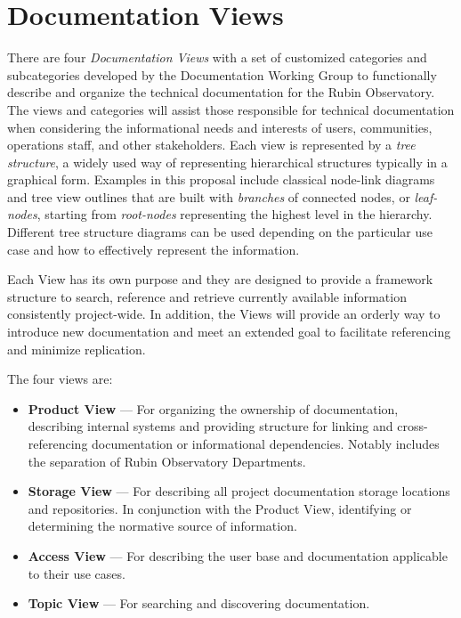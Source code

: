 \section{Documentation Views}
\label{sec:views}

There are four \emph{Documentation Views} with a set of customized categories and subcategories developed by the Documentation Working Group to functionally describe and organize the technical documentation for the Rubin Observatory.
The views and categories will assist those responsible for technical documentation when considering the informational needs and interests of users, communities, operations staff, and other stakeholders.
Each view is represented by a \emph{tree structure}, a widely used way of representing hierarchical structures typically in a graphical form.
Examples in this proposal include classical node-link diagrams and tree view outlines that are built with \emph{branches} of connected nodes, or \emph{leaf-nodes}, starting from \emph{root-nodes} representing the highest level in the hierarchy.
Different tree structure diagrams can be used depending on the particular use case and how to effectively represent the information.
\citep{wiki-tree-diagram-cite}

Each View has its own purpose and they are designed to provide a framework structure to search, reference and retrieve currently available information consistently project-wide.
In addition, the Views will provide an orderly way to introduce new documentation and meet an extended goal to facilitate referencing and minimize replication.

The four views are:

\begin{itemize}

  \item \textbf{Product View} --- For organizing the ownership of documentation, describing internal systems and providing structure for linking and cross-referencing documentation or informational dependencies.
  Notably includes the separation of Rubin Observatory Departments.

  \item \textbf{Storage View} --- For describing all project documentation storage locations and repositories.
  In conjunction with the Product View, identifying or determining the normative source of information.

  \item \textbf{Access View} --- For describing the user base and documentation applicable to their use cases.

  \item \textbf{Topic View} --- For searching and discovering documentation.

\end{itemize}

